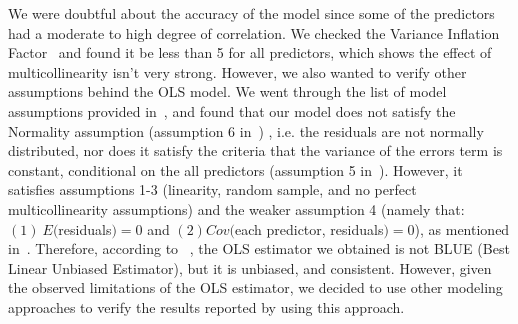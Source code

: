 \documentclass[smallcondensed]{svjour3}     %
\begin{document}
We were doubtful about the accuracy of the model since some of the predictors had a moderate to high degree of correlation. We checked the Variance Inflation Factor~\cite{menard1995applied} and found it be less than 5 for all predictors, which shows the effect of multicollinearity isn't very strong. However, we also wanted to verify other assumptions behind the OLS model. We went through the list of model assumptions provided in~\cite{ols}, and found that our model does not satisfy the Normality assumption (assumption 6 in~\cite{ols}) , i.e. the residuals are not normally distributed, nor does it satisfy the criteria that the variance of the errors term is constant, conditional on the all predictors (assumption 5 in~\cite{ols}). However, it satisfies assumptions 1-3 (linearity, random sample, and no perfect multicollinearity  assumptions) and the weaker assumption 4 (namely that: $(1)\ E($residuals$) = 0$ and $(2) Cov($each predictor, residuals$) = 0$), as mentioned in~\cite{ols}. Therefore, according to ~\cite{ols}, the OLS estimator we obtained is not BLUE (Best Linear Unbiased Estimator), but it is unbiased, and consistent. However, given the observed limitations of the OLS estimator, we decided to use other modeling approaches to verify the results reported by using this approach.


\begin{table}[ht]
\caption{Summary Result of LR model for ``Exceptions"}\label{t:LR1}
\centering
{}
\vspace{-10pt}
\end{table}
\end{document}
